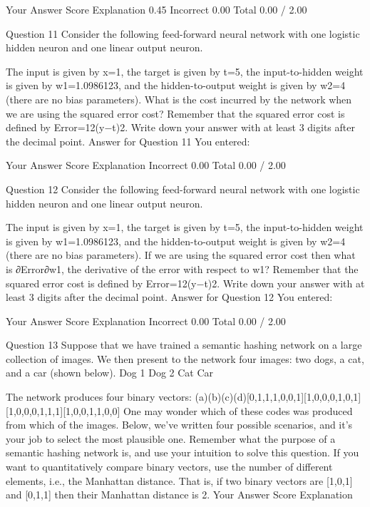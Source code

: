 Your Answer		Score	Explanation
0.45	Incorrect	0.00	
Total		0.00 / 2.00	

Question 11
Consider the following feed-forward neural network with one logistic hidden neuron and one linear output neuron.

The input is given by x=1, the target is given by t=5, the input-to-hidden weight is given by w1=1.0986123, and the hidden-to-output weight is given by w2=4 (there are no bias parameters). What is the cost incurred by the network when we are using the squared error cost? Remember that the squared error cost is defined by Error=12(y−t)2. Write down your answer with at least 3 digits after the decimal point.
Answer for Question 11
You entered:

Your Answer		Score	Explanation
Incorrect	0.00	
Total		0.00 / 2.00	

Question 12
Consider the following feed-forward neural network with one logistic hidden neuron and one linear output neuron.

The input is given by x=1, the target is given by t=5, the input-to-hidden weight is given by w1=1.0986123, and the hidden-to-output weight is given by w2=4 (there are no bias parameters). If we are using the squared error cost then what is ∂Error∂w1, the derivative of the error with respect to w1? Remember that the squared error cost is defined by Error=12(y−t)2. Write down your answer with at least 3 digits after the decimal point.
Answer for Question 12
You entered:

Your Answer		Score	Explanation
Incorrect	0.00	
Total		0.00 / 2.00	

Question 13
Suppose that we have trained a semantic hashing network on a large collection of images. We then present to the network four images: two dogs, a cat, and a car (shown below).
Dog 1
Dog 2
Cat
Car

The network produces four binary vectors: (a)(b)(c)(d)[0,1,1,1,0,0,1][1,0,0,0,1,0,1][1,0,0,0,1,1,1][1,0,0,1,1,0,0]
One may wonder which of these codes was produced from which of the images. Below, we've written four possible scenarios, and it's your job to select the most plausible one.
Remember what the purpose of a semantic hashing network is, and use your intuition to solve this question. If you want to quantitatively compare binary vectors, use the number of different elements, i.e., the Manhattan distance. That is, if two binary vectors are [1,0,1] and [0,1,1] then their Manhattan distance is 2.
Your Answer		Score	Explanation

